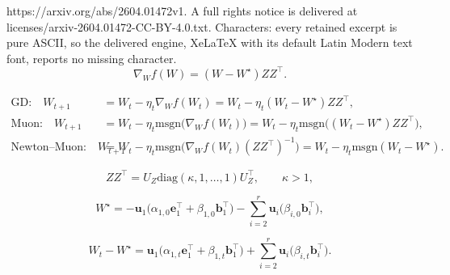 \documentclass[10pt,a4paper]{amsart}
\begin{document}
https://arxiv.org/abs/2604.01472v1. A full rights notice is delivered at licenses/arxiv-2604.01472-CC-BY-4.0.txt. Characters: every retained excerpt is pure ASCII, so the delivered engine, XeLaTeX with its default Latin Modern text font, reports no missing character.
\begin{equation}
  \label{eq:ss-grad}
  \nabla_{{W}} f({W}) = ({W}-W^\star){Z}{Z}^\top.
\end{equation}

\begin{align}
  \label{eq:ss-gd-update}
  \text{GD:}\quad
  W_{t+1}
  &=
  W_t-\eta_t \nabla_{W} f(W_t)
  =
  W_t-\eta_t ( W_t-W^\star )ZZ^\top, \\
  \label{eq:ss-muon-update}
  \text{Muon:}\quad
  W_{t+1}
  &=
  W_t-\eta_t \mathrm{msgn}\big(\nabla_{W} f(W_t)\big)
  =
  W_t-\eta_t \mathrm{msgn}\big(( W_t-W^\star )ZZ^\top\big), \\
  \label{eq:ss-Newton--Muon-update}
  \text{Newton--Muon:}\quad
  W_{t+1}
  &=
  W_t-\eta_t \mathrm{msgn}\big(\nabla_{W} f(W_t)(ZZ^\top)^{-1}\big)
  =
  W_t-\eta_t \mathrm{msgn}(W_t-W^\star).
\end{align}

\begin{equation}
  \label{eq:ss-spike}
  {Z}{Z}^\top = {U}_{Z}\mathrm{diag}(\kappa,1,\ldots,1){U}_{Z}^\top,
  \qquad \kappa>1,
\end{equation}

\begin{equation}
  \label{eq:ss-init-decomp}
  W^\star
  =
  -\boldsymbol{u}_1 \big(\alpha_{1,0} \boldsymbol{e}_1^\top + \beta_{1,0} \boldsymbol{b}_1^\top\big)
  -
  \sum_{i=2}^r \boldsymbol{u}_i \big(\beta_{i,0} \boldsymbol{b}_i^\top\big),
\end{equation}

\begin{equation}
  \label{eq:ss-residual-decomp}
  W_t-W^\star
  =
  \boldsymbol{u}_1 \big(\alpha_{1,t} \boldsymbol{e}_1^\top + \beta_{1,t} \boldsymbol{b}_1^\top\big)
  +
  \sum_{i=2}^r \boldsymbol{u}_i \big(\beta_{i,t} \boldsymbol{b}_i^\top\big).
\end{equation}
\end{document}
